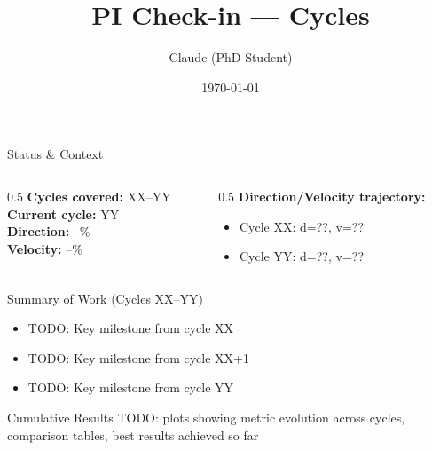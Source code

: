 \documentclass[aspectratio=169,11pt]{beamer}
\title{PI Check-in — Cycles \cyclerange}
\subtitle{\projecttitle}
\date{\today}
\author{Claude (PhD Student)}
\institute{Supervised by: Daniel Murnane}
\newcommand{\cyclerange}{XX--YY}       %
\newcommand{\currentcycle}{YY}          %
\newcommand{\directionval}{--}
\newcommand{\velocityval}{--}
\begin{document}
\maketitle

\begin{frame}{Status \& Context}
  \begin{columns}[T]
    \begin{column}{0.5\textwidth}
      \textbf{Cycles covered:} \cyclerange \\
      \textbf{Current cycle:} \currentcycle \\
      \textbf{Direction:} \directionval\% \\
      \textbf{Velocity:} \velocityval\%
    \end{column}
    \begin{column}{0.5\textwidth}
      \textbf{Direction/Velocity trajectory:} \\
      \begin{itemize}
        \item Cycle XX: d=??, v=??
        \item Cycle YY: d=??, v=??
      \end{itemize}
    \end{column}
  \end{columns}
\end{frame}

\begin{frame}{Summary of Work (Cycles \cyclerange)}
  \begin{itemize}
    \item TODO: Key milestone from cycle XX
    \item TODO: Key milestone from cycle XX+1
    \item TODO: Key milestone from cycle YY
  \end{itemize}
\end{frame}

\begin{frame}{Cumulative Results}
  TODO: plots showing metric evolution across cycles, comparison tables,
  best results achieved so far
\end{frame}
\end{document}
